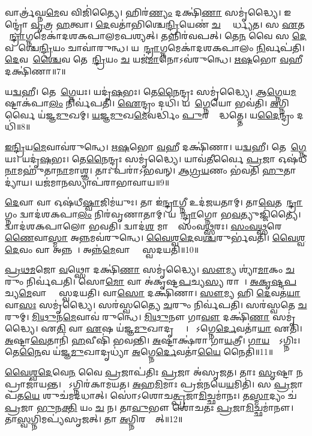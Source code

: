 𑌵𑌾𑌰𑍍𑌤𑍍𑌰॑𑌘𑍍𑌨\ul{𑌮𑍇}𑌵 𑌵𑌿𑌜𑌿॑𑌤𑍍𑌯𑍈।
𑌹𑌿𑌰॑\ul{𑌣𑍍𑌯𑌂} 𑌦𑌕𑍍𑌷𑌿॑\ul{𑌣𑌾} 𑌸𑌮𑍃॑𑌦𑍍𑌧𑍍𑌯𑍈।
𑌇𑌨𑍍𑌦𑍍𑌰𑍋॑ \ul{𑌵𑍃}𑌤𑍍𑌰 \ul{𑌹}𑌤𑍍𑌵𑌾।
\ul{𑌦𑍇}𑌵𑌤𑌾॑𑌭𑌿𑌶𑍍𑌚𑍇\ul{𑌨𑍍𑌦𑍍𑌰𑌿}𑌯𑍇𑌣॑ \ul{𑌚} 𑌵𑍍𑌯𑌾᳚𑌰𑍍𑌧𑍍𑌯𑌤।
𑌸 \ul{𑌏}𑌤𑌮𑍈᳚\ul{𑌨𑍍𑌦𑍍𑌰𑌾}𑌗𑍍𑌨𑌮𑍇𑌕𑌾॑𑌦𑌶𑌕𑌪𑌾𑌲𑌮𑌪𑌶𑍍𑌯𑌤𑍍।
𑌤𑌨𑍍𑌨𑌿𑌰॑𑌵𑌪𑌤𑍍।
𑌤𑍇\ul{𑌨} 𑌵𑍈 𑌸 \ul{𑌦𑍇}𑌵𑌤𑌾᳚𑌶𑍍𑌚𑍇\ul{𑌨𑍍𑌦𑍍𑌰𑌿}𑌯𑌂 𑌚𑌾𑌵𑌾॑𑌰𑍁𑌨𑍍𑌧।
𑌯𑌦𑍈᳚\ul{𑌨𑍍𑌦𑍍𑌰𑌾}𑌗𑍍𑌨𑌮𑍇𑌕𑌾॑𑌦𑌶𑌕𑌪𑌾𑌲𑌂 \ul{𑌨𑌿}𑌰𑍍𑌵𑌪॑𑌤𑌿।
\ul{𑌦𑍇}𑌵𑌤𑌾᳚\ul{𑌶𑍍𑌚𑍈}𑌵 𑌤𑍇𑌨𑍇᳚\ul{𑌨𑍍𑌦𑍍𑌰𑌿}𑌯𑌂 \ul{𑌚} 𑌯𑌜॑\ul{𑌮𑌾}𑌨𑍋\-𑌽𑌵॑𑌰𑍁𑌨𑍍𑌧𑍇।
\ul{𑌋}\ul{𑌷}𑌭𑍋 \ul{𑌵}𑌹𑍀 𑌦𑌕𑍍𑌷𑌿॑𑌣𑌾॥7॥

𑌯\ul{𑌦𑍍𑌵}𑌹𑍀।
𑌤𑍇𑌨𑌾᳚\ul{𑌗𑍍𑌨𑍇}𑌯𑌃।
𑌯𑌦𑍃॑\ul{𑌷}𑌭𑌃।
𑌤𑍇\ul{𑌨𑍈}𑌨𑍍𑌦𑍍𑌰𑌃 𑌸𑌮𑍃॑𑌦𑍍𑌧𑍍𑌯𑍈।
\ul{𑌆}\ul{𑌗𑍍𑌨𑍇}𑌯\ul{𑌮}𑌷𑍍𑌟𑌾𑌕॑𑌪𑌾\ul{𑌲𑌂} 𑌨𑌿𑌰𑍍𑌵॑𑌪𑌤𑌿।
\ul{𑌐}𑌨𑍍𑌦𑍍𑌰𑌂 𑌦𑌧𑌿॑।
𑌯𑌦𑌾᳚\ul{𑌗𑍍𑌨𑍇}𑌯𑍋 𑌭𑌵॑𑌤𑌿।
\ul{𑌅}𑌗𑍍𑌨𑌿𑌰𑍍𑌵𑍈 𑌯॑𑌜𑍍𑌞\ul{𑌮𑍁}𑌖𑌮𑍍।
\ul{𑌯}\ul{𑌜𑍍𑌞}\ul{𑌮𑍁}𑌖\ul{𑌮𑍇}𑌵𑌰𑍍𑌦𑍍𑌧𑌿𑌂॑ \ul{𑌪𑍁}𑌰𑌸𑍍𑌤𑌾᳚𑌦𑍍𑌧𑌤𑍍𑌤𑍇।
𑌯\ul{𑌦𑍈}𑌨𑍍𑌦𑍍𑌰𑌂 𑌦𑌧𑌿॑॥8॥

\ul{𑌇}\ul{𑌨𑍍𑌦𑍍𑌰𑌿}𑌯\ul{𑌮𑍇}𑌵𑌾𑌵॑𑌰𑍁𑌨𑍍𑌧𑍇।
\ul{𑌋}\ul{𑌷}𑌭𑍋 \ul{𑌵}𑌹𑍀 𑌦𑌕𑍍𑌷𑌿॑𑌣𑌾।
𑌯\ul{𑌦𑍍𑌵}𑌹𑍀।
𑌤𑍇𑌨𑌾᳚\ul{𑌗𑍍𑌨𑍇}𑌯𑌃।
𑌯𑌦𑍃॑\ul{𑌷}𑌭𑌃।
𑌤𑍇\ul{𑌨𑍈}𑌨𑍍𑌦𑍍𑌰𑌃 𑌸𑌮𑍃॑𑌦𑍍𑌧𑍍𑌯𑍈।
𑌯𑌾𑌵॑\ul{𑌤𑍀}𑌰𑍍𑌵𑍈 \ul{𑌪𑍍𑌰}𑌜𑌾 𑌓𑌷॑𑌧𑍀\ul{𑌨𑌾}𑌮𑌹𑍁॑𑌤𑌾\ul{𑌨𑌾}𑌮𑌾𑌶𑍍𑌞\sn{}।
𑌤𑌾𑌃 𑌪𑌰𑌾॑\-𑌽𑌭𑌵𑌨𑍍।
\ul{𑌆}\ul{𑌗𑍍𑌰}\ul{𑌯}𑌣𑌂 𑌭॑𑌵𑌤𑌿 \ul{𑌹𑍁}𑌤𑌾𑌦𑍍𑌯𑌾॑𑌯।
𑌯𑌜॑𑌮𑌾\ul{𑌨}𑌸𑍍𑌯𑌾𑌪॑𑌰𑌾\-𑌭𑌾𑌵𑌾𑌯॥9॥

\ul{𑌦𑍇}𑌵𑌾 𑌵𑌾 𑌓𑌷॑𑌧𑍀\ul{𑌷𑍍𑌵𑌾}𑌜𑌿𑌮॑𑌯𑍁𑌃।
𑌤𑌾 𑌇॑\ul{𑌨𑍍𑌦𑍍𑌰𑌾}𑌗𑍍𑌨𑍀 𑌉𑌦॑𑌜𑌯𑌤𑌾𑌮𑍍।
𑌤𑌾\ul{𑌵𑍇}𑌤𑌮𑍈᳚\ul{𑌨𑍍𑌦𑍍𑌰𑌾}𑌗𑍍𑌨𑌂 𑌦𑍍𑌵𑌾𑌦॑𑌶𑌕𑌪𑌾\ul{𑌲𑌂} 𑌨𑌿𑌰॑𑌵𑍃𑌣𑌾𑌤𑌾𑌮𑍍।
𑌯𑌦𑍈᳚\ul{𑌨𑍍𑌦𑍍𑌰𑌾}𑌗𑍍𑌨𑍋 𑌭\ul{𑌵}𑌤𑍍𑌯𑍁𑌜𑍍𑌜𑌿॑𑌤𑍍𑌯𑍈।
𑌦𑍍𑌵𑌾𑌦॑𑌶𑌕𑌪𑌾𑌲𑍋 𑌭𑌵𑌤𑌿।
𑌦𑍍𑌵𑌾𑌦॑\ul{𑌶} 𑌮𑌾𑌸𑌾𑌃᳚ 𑌸𑌂𑌵\ul{𑌥𑍍𑌸}𑌰𑌃।
\ul{𑌸𑌂}\ul{𑌵}\ul{𑌥𑍍𑌸}𑌰𑍇\ul{𑌣𑍈}𑌵𑌾\ul{𑌸𑍍𑌮𑌾} 𑌅\ul{𑌨𑍍𑌨}𑌮𑌵॑𑌰𑍁𑌨𑍍𑌧𑍇।
\ul{𑌵𑍈}\ul{𑌶𑍍𑌵}\ul{𑌦𑍇}𑌵\-\ul{𑌶𑍍𑌚}𑌰𑍁𑌰𑍍𑌭॑𑌵𑌤𑌿।
\ul{𑌵𑍈}\ul{𑌶𑍍𑌵}\ul{𑌦𑍇}𑌵𑌂 𑌵𑌾 𑌅𑌨𑍍𑌨𑌮𑍍᳚।
𑌅𑌨𑍍𑌨॑\ul{𑌮𑍇}𑌵𑌾𑌸𑍍𑌮𑍈᳚ 𑌸𑍍𑌵𑌦𑌯𑌤𑌿॥10॥

\ul{𑌪𑍍𑌰}\ul{𑌥}\ul{𑌮}𑌜𑍋 \ul{𑌵}𑌥𑍍𑌸𑍋 𑌦𑌕𑍍𑌷𑌿॑\ul{𑌣𑌾} 𑌸𑌮𑍃॑𑌦𑍍𑌧𑍍𑌯𑍈।
\ul{𑌸𑍗}𑌮𑍍𑌯 𑌶𑍍𑌯𑌾॑\ul{𑌮𑌾}𑌕𑌂 \ul{𑌚}𑌰𑍁𑌂 𑌨𑌿𑌰𑍍𑌵॑𑌪𑌤𑌿।
𑌸𑍋\ul{𑌮𑍋} 𑌵𑌾 𑌅॑𑌕𑍃𑌷𑍍𑌟\ul{𑌪}𑌚𑍍𑌯\ul{𑌸𑍍𑌯} 𑌰𑌾𑌜𑌾᳚।
\ul{𑌅}\ul{𑌕𑍃}\ul{𑌷𑍍𑌟}\ul{𑌪}𑌚𑍍𑌯\ul{𑌮𑍇}𑌵𑌾𑌸𑍍𑌮𑍈᳚ 𑌸𑍍𑌵𑌦𑌯𑌤𑌿।
𑌵𑌾\ul{𑌸𑍋} 𑌦𑌕𑍍𑌷𑌿॑𑌣𑌾।
\ul{𑌸𑍗}𑌮𑍍𑌯 𑌹𑌿 \ul{𑌦𑍇}𑌵𑌤॑\ul{𑌯𑌾} 𑌵𑌾\ul{𑌸𑌃} 𑌸𑌮𑍃॑𑌦𑍍𑌧𑍍𑌯𑍈।
𑌸𑌰॑𑌸𑍍𑌵𑌤𑍍𑌯𑍈 \ul{𑌚}𑌰𑍁𑌂 𑌨𑌿𑌰𑍍𑌵॑𑌪𑌤𑌿।
𑌸𑌰॑𑌸𑍍𑌵𑌤𑍇 \ul{𑌚}𑌰𑍁𑌮𑍍।
\ul{𑌮𑌿}\ul{𑌥𑍁}𑌨\ul{𑌮𑍇}𑌵𑌾𑌵॑ 𑌰𑍁𑌨𑍍𑌧𑍇।
\ul{𑌮𑌿}\ul{𑌥𑍁}𑌨𑍗 𑌗𑌾\ul{𑌵𑍗} 𑌦𑌕𑍍𑌷𑌿॑\ul{𑌣𑌾} 𑌸𑌮𑍃॑𑌦𑍍𑌧𑍍𑌯𑍈।
𑌏\ul{𑌤𑌿} 𑌵𑌾 \ul{𑌏}𑌷 𑌯॑𑌜𑍍𑌞\ul{𑌮𑍁}𑌖𑌾𑌦𑍃𑌧𑍍𑌯𑌾𑌃᳚।
𑌯𑍋᳚𑌽𑌗𑍍𑌨𑍇\ul{𑌰𑍍𑌦𑍇}𑌵𑌤𑌾॑\ul{𑌯𑌾} 𑌏𑌤𑌿॑।
\ul{𑌅}𑌷𑍍𑌟𑌾\ul{𑌵𑍇}𑌤𑌾𑌨𑌿॑ \ul{𑌹}𑌵𑍀𑌷𑌿॑ 𑌭𑌵𑌨𑍍𑌤𑌿।
\ul{𑌅}𑌷𑍍𑌟𑌾𑌕𑍍𑌷॑𑌰𑌾 𑌗𑌾\ul{𑌯}𑌤𑍍𑌰𑍀।
\ul{𑌗𑌾}\ul{𑌯}𑌤𑍍𑌰𑍋᳚\-𑌽𑌗𑍍𑌨𑌿𑌃।
𑌤𑍇\ul{𑌨𑍈}𑌵 𑌯॑𑌜𑍍𑌞\ul{𑌮𑍁}𑌖𑌾𑌦𑍃𑌧𑍍𑌯𑌾॑ \ul{𑌅}𑌗𑍍𑌨𑍇\ul{𑌰𑍍𑌦𑍇}𑌵𑌤𑌾॑\ul{𑌯𑍈} 𑌨𑍈𑌤𑌿॑॥11॥

\ul{𑌵𑍈}\ul{𑌶𑍍𑌵}\ul{𑌦𑍇}𑌵𑍇\ul{𑌨} 𑌵𑍈 \ul{𑌪𑍍𑌰}𑌜𑌾𑌪॑𑌤𑌿𑌃 \ul{𑌪𑍍𑌰}𑌜𑌾 𑌅॑𑌸𑍃𑌜𑌤।
𑌤𑌾𑌃 \ul{𑌸𑍃}𑌷𑍍𑌟𑌾 𑌨 𑌪𑍍𑌰𑌾𑌜𑌾॑𑌯𑌨𑍍𑌤।
𑌸𑍋᳚𑌽𑌗𑍍𑌨𑌿𑌰॑𑌕𑌾𑌮𑌯𑌤।
\ul{𑌅}𑌹\ul{𑌮𑌿}𑌮𑌾𑌃 𑌪𑍍𑌰𑌜॑𑌨𑌯𑍇\ul{𑌯}𑌮𑌿𑌤𑌿॑।
𑌸 \ul{𑌪𑍍𑌰}𑌜𑌾𑌪॑𑌤\ul{𑌯𑍇} 𑌶𑍁𑌚॑𑌮𑌦𑌧𑌾𑌤𑍍।
𑌸𑍋॑𑌽𑌶𑍋𑌚\ul{𑌤𑍍𑌪𑍍𑌰}𑌜𑌾\ul{𑌮𑌿}𑌚𑍍𑌛𑌮𑌾॑𑌨𑌃।
𑌤\ul{𑌸𑍍𑌮𑌾}𑌦𑍍𑌯𑌂 𑌚॑ \ul{𑌪𑍍𑌰}𑌜𑌾 \ul{𑌭𑍁}𑌨\ul{𑌕𑍍𑌤𑌿} 𑌯𑌂 \ul{𑌚} 𑌨।
𑌤𑌾\ul{𑌵𑍁}𑌭𑍗 𑌶𑍋॑𑌚𑌤𑌃 \ul{𑌪𑍍𑌰}𑌜𑌾\ul{𑌮𑌿}𑌚𑍍𑌛𑌮𑌾॑𑌨𑍗।
𑌤𑌾\ul{𑌸𑍍𑌵}𑌗𑍍𑌨𑌿𑌮𑌪𑍍𑌯॑𑌸𑍃𑌜𑌤𑍍।
𑌤𑌾 \ul{𑌅}𑌗𑍍𑌨𑌿𑌰𑌧𑍍𑌯𑍈᳚𑌤𑍍॥12॥

